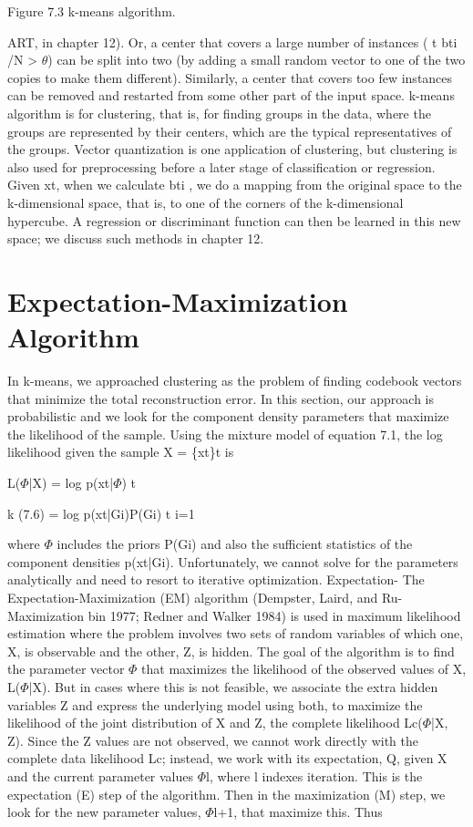 Figure 7.3 k-means algorithm.

ART, in chapter 12). Or, a center that covers a large number of instances ( t bti /N > $\theta$) can be split into two (by adding a small random vector to one of the two copies to make them different). Similarly, a center that covers too few instances can be removed and restarted from some other part of the input space. k-means algorithm is for clustering, that is, for finding groups in the data, where the groups are represented by their centers, which are the typical representatives of the groups. Vector quantization is one application of clustering, but clustering is also used for preprocessing before a later stage of classification or regression. Given xt, when we calculate bti , we do a mapping from the original space to the k-dimensional space, that is, to one of the corners of the k-dimensional hypercube. A regression or discriminant function can then be learned in this new space; we discuss such methods in chapter 12.

\section{Expectation-Maximization Algorithm}

In k-means, we approached clustering as the problem of finding codebook vectors that minimize the total reconstruction error. In this section, our approach is probabilistic and we look for the component density parameters that maximize the likelihood of the sample. Using the mixture model of equation 7.1, the log likelihood given the sample X = \{xt\}t is

L($\Phi$|X) = log p(xt|$\Phi$) t

k (7.6) = log p(xt|Gi)P(Gi) t i=1

where $\Phi$ includes the priors P(Gi) and also the sufficient statistics of the component densities p(xt|Gi). Unfortunately, we cannot solve for the parameters analytically and need to resort to iterative optimization. Expectation- The Expectation-Maximization (EM) algorithm (Dempster, Laird, and Ru- Maximization bin 1977; Redner and Walker 1984) is used in maximum likelihood estimation where the problem involves two sets of random variables of which one, X, is observable and the other, Z, is hidden. The goal of the algorithm is to find the parameter vector $\Phi$ that maximizes the likelihood of the observed values of X, L($\Phi$|X). But in cases where this is not feasible, we associate the extra hidden variables Z and express the underlying model using both, to maximize the likelihood of the joint distribution of X and Z, the complete likelihood Lc($\Phi$|X, Z). Since the Z values are not observed, we cannot work directly with the complete data likelihood Lc; instead, we work with its expectation, Q, given X and the current parameter values $\Phi$l, where l indexes iteration. This is the expectation (E) step of the algorithm. Then in the maximization (M) step, we look for the new parameter values, $\Phi$l+1, that maximize this. Thus

